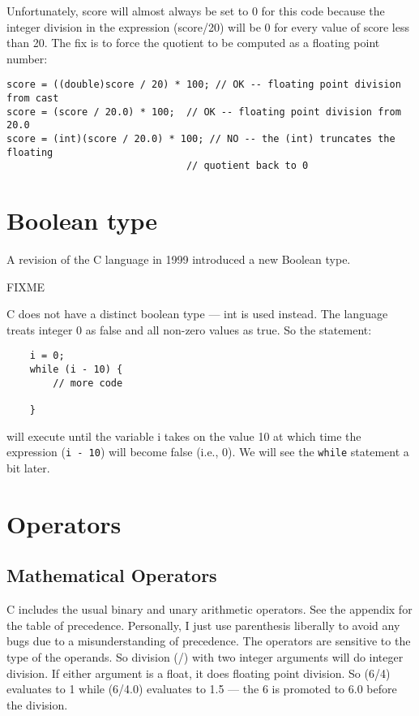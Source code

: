 Unfortunately, score will almost always be set to 0 for this code because the integer division in the expression (score/20) will be 0 for every value of score less than 20. The fix is to force the quotient to be computed as a floating point number:

\begin{lstlisting}
score = ((double)score / 20) * 100; // OK -- floating point division from cast
score = (score / 20.0) * 100;  // OK -- floating point division from 20.0
score = (int)(score / 20.0) * 100; // NO -- the (int) truncates the floating
                               // quotient back to 0
\end{lstlisting}

\section{Boolean type}


A revision of the C language in 1999 introduced a new Boolean type.  

FIXME

C does not have a distinct boolean type --- int is used instead. The language treats integer 0 as false and all non-zero values as true. So the statement:

\begin{lstlisting}
    i = 0;
    while (i - 10) {
        // more code

    }
\end{lstlisting}

will execute until the variable i takes on the value 10 at which time the expression (\lstinline{i - 10}) will become false (i.e., 0).  We will see the \lstinline{while} statement a bit later.

\section{Operators}

\subsection{Mathematical Operators}

C includes the usual binary and unary arithmetic operators. See the appendix for the table of precedence. Personally, I just use parenthesis liberally to avoid any bugs due to a misunderstanding of precedence. The operators are sensitive to the type of the operands. So division (/) with two integer arguments will do integer division. If either argument is a float, it does floating point division. So (6/4) evaluates to 1 while (6/4.0) evaluates to 1.5 --- the 6 is promoted to 6.0 before the division.

